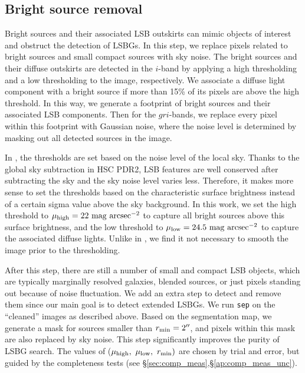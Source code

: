 \documentclass[twocolumn,astrosymb,twocolappendix]{aastex631}
\newcommand{\sbunit}{\mathrm{mag\ arcsec}^{-2}}
\newcommand{\code}[1]{\texttt{#1}}
\begin{document}
\begin{CJK*}{UTF8}{gbsn}
\subsection{Bright source removal}
Bright sources and their associated LSB outskirts can mimic objects of interest and obstruct the detection of LSBGs. In this step, we replace pixels related to bright sources and small compact sources with sky noise. The bright sources and their diffuse outskirts are detected in the $i$-band by applying a high thresholding and a low thresholding to the image, respectively. We associate a diffuse light component with a bright source if more than 15\% of its pixels are above the high threshold. In this way, we generate a footprint of bright sources and their associated LSB components. Then for the $gri$-bands, we replace every pixel within this footprint with Gaussian noise, where the noise level is determined by masking out all detected sources in the image. 
    
In , the thresholds are set based on the noise level of the local sky. Thanks to the global sky subtraction in HSC PDR2, LSB features are well conserved after subtracting the sky and the sky noise level varies less. Therefore, it makes more sense to set the thresholds based on the characteristic surface brightness instead of a certain sigma value above the sky background. In this work, we set the high threshold to $\mu_{\rm high} = 22\ \sbunit$ to capture all bright sources above this surface brightness, and the low threshold to $\mu_{\rm low} = 24.5\ \sbunit$ to capture the associated diffuse lights. Unlike in , we find it not necessary to smooth the image prior to the thresholding. 

After this step, there are still a number of small and compact LSB objects, which are typically marginally resolved galaxies, blended sources, or just pixels standing out because of noise fluctuation. We add an extra step to detect and remove them since our main goal is to detect extended LSBGs. We run \code{sep} on the ``cleaned'' images as described above. Based on the segmentation map, we generate a mask for sources smaller than $r_{\rm min} = 2\mbox{$^{\prime\prime}$}$, and pixels within this mask are also replaced by sky noise. This step significantly improves the purity of LSBG search. The values of ($\mu_{\rm high},\ \mu_{\rm low},\ r_{\rm min})$ are chosen by trial and error, but guided by the completeness tests (see \S \ref{sec:comp_meas},\S\ref{ap:comp_meas_unc}). 
    

\end{CJK*}
\end{document}
